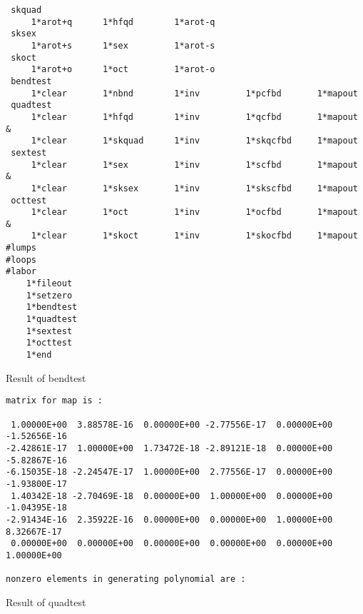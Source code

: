 \begin{footnotesize}
\begin{verbatim}
 skquad
     1*arot+q      1*hfqd        1*arot-q
 sksex
     1*arot+s      1*sex         1*arot-s
 skoct
     1*arot+o      1*oct         1*arot-o
 bendtest
     1*clear       1*nbnd        1*inv         1*pcfbd       1*mapout
 quadtest
     1*clear       1*hfqd        1*inv         1*qcfbd       1*mapout   &
     1*clear       1*skquad      1*inv         1*skqcfbd     1*mapout
 sextest
     1*clear       1*sex         1*inv         1*scfbd       1*mapout   &
     1*clear       1*sksex       1*inv         1*skscfbd     1*mapout
 octtest
     1*clear       1*oct         1*inv         1*ocfbd       1*mapout   &
     1*clear       1*skoct       1*inv         1*skocfbd     1*mapout
#lumps
#loops
#labor
    1*fileout
    1*setzero
    1*bendtest
    1*quadtest
    1*sextest
    1*octtest
    1*end
\end{verbatim}
\end{footnotesize}
Result of bendtest
\begin{footnotesize}
\begin{verbatim}
matrix for map is :

 1.00000E+00  3.88578E-16  0.00000E+00 -2.77556E-17  0.00000E+00 -1.52656E-16
-2.42861E-17  1.00000E+00  1.73472E-18 -2.89121E-18  0.00000E+00 -5.82867E-16
-6.15035E-18 -2.24547E-17  1.00000E+00  2.77556E-17  0.00000E+00 -1.93800E-17
 1.40342E-18 -2.70469E-18  0.00000E+00  1.00000E+00  0.00000E+00 -1.04395E-18
-2.91434E-16  2.35922E-16  0.00000E+00  0.00000E+00  1.00000E+00  8.32667E-17
 0.00000E+00  0.00000E+00  0.00000E+00  0.00000E+00  0.00000E+00  1.00000E+00

nonzero elements in generating polynomial are :

\end{verbatim}
\end{footnotesize}
Result of quadtest
